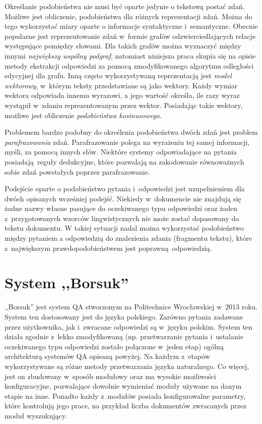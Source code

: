 \documentclass[a4paper, twoside, 12pt]{report}
\begin{document}
            Określanie podobieństwa nie musi być oparte jedynie o tekstową postać zdań. Możliwe jest obliczenie,
            podobieństwa dla różnych reprezentacji zdań. Można do tego wykorzystać miary oparte o informacje syntaktyczne
            i~semantyczne. Obecnie popularne jest reprezentowanie zdań w~formie grafów odzwierciedlających relacje
            występujące pomiędzy słowami. Dla takich grafów można wyznaczyć między innymi \emph{największy wspólny podgraf},
            natomiast niniejsza praca skupia się na opisie metody ekstrakcji odpowiedzi za pomocą zmodyfikowanego
            algorytmu odległości edycyjnej dla grafu. Inną często wykorzystywaną reprezentacją jest \emph{model wektorowy},
            w~którym teksty przedstawiane są jako wektory. Każdy wymiar wektora odpowiada innemu wyrazowi, a jego wartość
            określa, ile razy wyraz wystąpił w~zdaniu reprezentowanym przez wektor. Posiadając takie wektory, możliwe jest
            obliczenie \emph{podobieństwa kosinusowego}\cite{SPEECHANDLANGUAGEPROCESSING}.

            Problemem bardzo podobny do określenia podobieństwa dwóch zdań jest problem \emph{parafrazowania} zdań.
            Parafrazowanie polega na wyrażeniu tej samej informacji, myśli, za pomocą innych słów. Niektóre systemy
            odpowiadające na pytania posiadają reguły dedukcyjne, które pozwalają na zakodowanie równoważnych sobie
            zdań powstałych poprzez parafrazowanie\cite{INFERENCE}.

            Podejście oparte o podobieństwo pytania i~odpowiedzi jest uzupełnieniem dla dwóch opisanych wcześniej podejść.
            Niekiedy w~dokumencie nie znajdują się żadne nazwy własne pasujące do oczekiwanego typu odpowiedzi
            oraz żaden z~przygotowanych wzorców lingwistycznych nie może zostać dopasowany do tekstu dokumentu.
            W takiej sytuacji nadal można wykorzystać podobieństwo między pytaniem a odpowiedzią do znalezienia
            zdania (fragmentu tekstu), które z~największym prawdopodobieństwem jest poprawną odpowiedzią.

    \section{System ,,Borsuk''} \label{BORSUKDESC}
        ,,Borsuk'' jest system QA stworzonym na Politechnice Wrocławskiej w~2013 roku. System ten dostosowany jest
        do języka polskiego. Zarówno pytania zadawane przez użytkownika, jak i~zwracane odpowiedzi są w~języku polskim.
        System ten działa zgodnie z~lekko zmodyfikowaną (np. przetwarzanie pytania i~ustalanie oczekiwanego typu odpowiedzi
        zostało połączone w~jeden etap) ogólną architekturą systemów QA opisaną powyżej.
        Na każdym z~etapów wykorzystywane są
        różne metody przetwarzania języka naturalnego. Co więcej, jest on zbudowany w~sposób modułowy oraz ma
        wysokie możliwości konfiguracyjne, pozwalające dowolnie wymieniać moduły używane na danym etapie na inne.
        Ponadto każdy z~modułów posiada konfigurowalne parametry, które kontrolują jego prace, na przykład liczba
        dokumentów zwracanych przez moduł wyszukujący.
\end{document}
